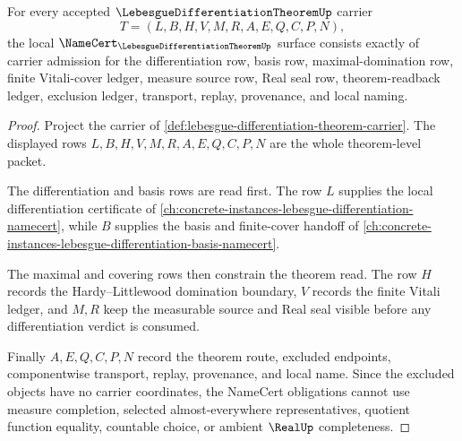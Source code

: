 \begin{theorem}\label{thm:lebesgue-differentiation-theorem-namecert-obligations}
For every accepted $\LebesgueDifferentiationTheoremUp$ carrier
$$
T=(L,B,H,V,M,R,A,E,Q,C,P,N),
$$
the local $\NameCert_{\LebesgueDifferentiationTheoremUp}$ surface consists exactly of carrier admission for the differentiation row, basis row, maximal-domination row, finite Vitali-cover ledger, measure source row, Real seal row, theorem-readback ledger, exclusion ledger, transport, replay, provenance, and local naming.
\end{theorem}
\begin{proof}
Project the carrier of \autoref{def:lebesgue-differentiation-theorem-carrier}. The displayed rows $L,B,H,V,M,R,A,E,Q,C,P,N$ are the whole theorem-level packet.

The differentiation and basis rows are read first. The row $L$ supplies the local differentiation certificate of \autoref{ch:concrete-instances-lebesgue-differentiation-namecert}, while $B$ supplies the basis and finite-cover handoff of \autoref{ch:concrete-instances-lebesgue-differentiation-basis-namecert}.

The maximal and covering rows then constrain the theorem read. The row $H$ records the Hardy--Littlewood domination boundary, $V$ records the finite Vitali ledger, and $M,R$ keep the measurable source and Real seal visible before any differentiation verdict is consumed.

Finally $A,E,Q,C,P,N$ record the theorem route, excluded endpoints, componentwise transport, replay, provenance, and local name. Since the excluded objects have no carrier coordinates, the NameCert obligations cannot use measure completion, selected almost-everywhere representatives, quotient function equality, countable choice, or ambient $\RealUp$ completeness.
\end{proof}



